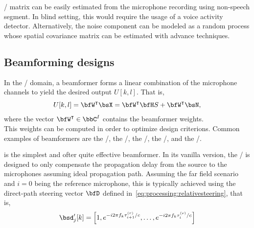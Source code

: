 \xPSD/ matrix can be easily estimated from the microphone recording using non-speech segment.
In blind setting, this would require the usage of a voice activity detector.
Alternatively, the noise component can be modeled as a random process whose spatial covariance matrix can be estimated with advance techniques.


\subsection{Beamforming designs}
In the \STFT/ domain, a beamformer forms a linear combination of the microphone channels to yield the desired output $U[k,l]$.
That is,
\begin{equation*}
    U[k,l] = \ktranspose{\bfW} \MICS = \ktranspose{\bfW} \FLTSS \SRC + \ktranspose{\bfW} \NSES,
\end{equation*}
where the vector $\ktranspose{\bfW} \in \bbC^{\numMics}$ contains the beamformer weights.
\\This weights can be computed in order to optimize design criterions.
Common examples of beamformers are the \DStxt/, the \MVDRtxt/, the \MaxSNRtxt/, the \MaxSINRtxt/, and the \LCMVtxt/.


 is the simplest and ofter quite effective beamformer.
In its vanilla version, the \DS/ is designed to only compensate the propagation delay from the source to the microphones assuming ideal propagation path.
Assuming the far field scenario and $i=0$ being the reference microphone, this is typically achieved using the direct-path steering vector $\bfD$ defined in~\cref{eq:processing:relativesteering}, that is,
\begin{equation}
    \bsd'_{j}[k] = \klist{
                         1,
                         \cste^{-\csti 2 \pi f_k \tau_{i+1}^{(r)} / \speedOfSound},
                         \ldots,
                         \cste^{-\csti 2 \pi f_k \tau_{i}^{(r)} / \speedOfSound}
                    }
\end{equation}


